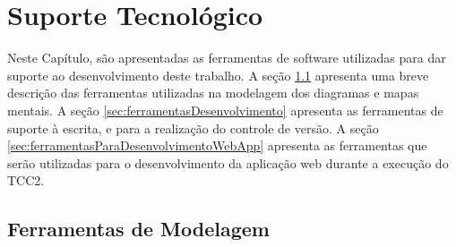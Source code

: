 \chapter{Suporte Tecnológico}
\label{chap:suporteTecnologico}

Neste Capítulo, são apresentadas as ferramentas de software utilizadas para dar suporte ao desenvolvimento deste trabalho. A seção \ref{sec:ferramentasModelagem} apresenta uma breve descrição das ferramentas utilizadas na modelagem dos diagramas e mapas mentais. A seção \ref{sec:ferramentasDesenvolvimento} apresenta as ferramentas de suporte à escrita, e para a realização do controle de versão. A seção \ref{sec:ferramentasParaDesenvolvimentoWebApp} apresenta as ferramentas que serão utilizadas para o desenvolvimento da aplicação web durante a execução do TCC2.  

\section{Ferramentas de Modelagem}
\label{sec:ferramentasModelagem}

